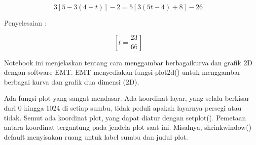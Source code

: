 \documentclass[a4paper,10pt]{article}
\begin{document}
\begin{eulernotebook}
\begin{eulercomment}
\begin{eulercomment}
\begin{eulercomment}
\begin{eulercomment}
\begin{eulercomment}
\begin{eulercomment}
\begin{eulercomment}
\begin{eulercomment}
\begin{eulercomment}
\begin{eulercomment}
\begin{eulercomment}
\begin{eulercomment}
\begin{eulercomment}
\end{eulercomment}
\begin{eulerformula}
\[
{3[5-3(4-t)]-2=5[3(5t-4)+8]-26}
\]
\end{eulerformula}
\begin{eulercomment}
Penyelesaian :
\end{eulercomment}
\begin{eulerformula}
\[
\left[ t=\frac{23}{66} \right] 
\]
\end{eulerformula}
\begin{eulercomment}
\begin{eulercomment}
\begin{eulercomment}
Notebook ini menjelaskan tentang cara menggambar berbagaikurva dan
grafik 2D dengan software EMT. EMT menyediakan fungsi plot2d() untuk
menggambar berbagai kurva dan grafik dua dimensi (2D).\\
\end{eulercomment}
\begin{eulercomment}
Ada fungsi plot yang sangat mendasar. Ada koordinat layar, yang selalu
berkisar dari 0 hingga 1024 di setiap sumbu, tidak peduli apakah
layarnya persegi atau tidak. Semut ada koordinat plot, yang dapat
diatur dengan setplot(). Pemetaan antara koordinat tergantung pada
jendela plot saat ini. Misalnya, shrinkwindow() default menyisakan
ruang untuk label sumbu dan judul plot.



\end{eulercomment}
\end{eulercomment}
\end{eulercomment}
\end{eulercomment}
\end{eulercomment}
\end{eulercomment}
\end{eulercomment}
\end{eulercomment}
\end{eulercomment}
\end{eulercomment}
\end{eulercomment}
\end{eulercomment}
\end{eulercomment}
\end{eulercomment}
\end{eulercomment}
\end{eulernotebook}
\end{document}
